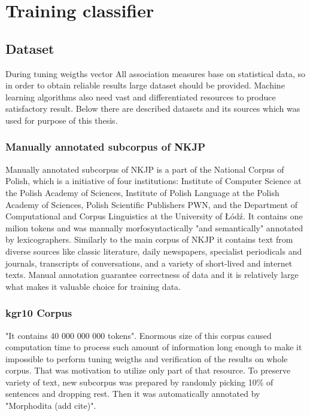 \chapter{Training classifier}

\section{Dataset}
During tuning weigths vector 
All association measures base on statistical data, so in order to obtain reliable results large dataset should be provided.
Machine learning algorithms also need vast and differentiated resources to produce satisfactory result.
Below there are described datasets and its sources which was used for purpose of this thesis.

\subsection{Manually annotated subcorpus of NKJP}
Manually annotated subcorpus of NKJP is a part of the National Corpus of Polish, which is a initiative of four institutions: 
Institute of Computer Science at the Polish Academy of Sciences, Institute of Polish Language at the Polish Academy of Sciences, 
Polish Scientific Publishers PWN, and the Department of Computational and Corpus Linguistics at the University of Łódź.
It contains one milion tokens and was manually morfosyntactically "and semantically" annotated by lexicographers. 
Similarly to the main corpus of NKJP it contains text from diverse sources like classic literature, daily newspapers, 
specialist periodicals and journals, transcripts of conversations, and a variety of short-lived and internet texts. 
Manual annotation guarantee correctness of data and it is relatively large what makes it valuable choice for training data.

\subsection{kgr10 Corpus}
"It contains 40 000 000 000 tokens". Enormous size of this corpus caused computation time to process such amount of information 
long enough to make it impossible to perform tuning weigths and verification of the results on whole corpus. 
That was motivation to utilize only part of that resource. To preserve variety of text, new subcorpus was prepared by randomly picking 
10\% of sentences and dropping rest. Then it was automatically annotated by "Morphodita (add cite)".

